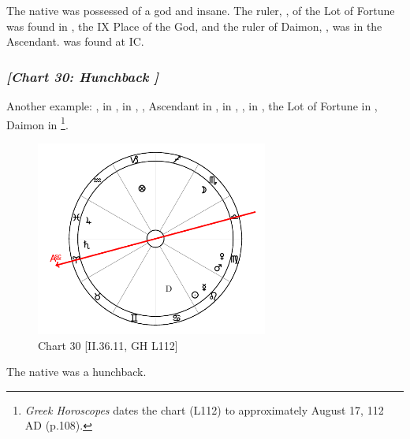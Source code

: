 The native was possessed of a god and insane. The ruler, \Jupiter, of the Lot of Fortune was found in \Libra, the
IX Place of the God, and the ruler of Daimon, \Saturn, was in the Ascendant. \Venus\xspace was found at IC.

\newpage
\subsubsection{\textit{[Chart 30: Hunchback ]}}
Another example: \Sun, \Mercury\xspace in \Leo, \Moon\xspace in \Scorpio, \Saturn, Ascendant in \Aries, \Jupiter\xspace in \Pisces, \Mars, \Venus\xspace in \Virgo, the Lot of Fortune in \Capricorn, Daimon in \Cancer
\footnote{\textit{Greek Horoscopes} dates the chart (L112) to approximately August 17, 112 AD (p.108).}.

\clearpage
\begin{figure}
\centering
\vspace{-20pt}
\includegraphics[width=0.68\textwidth]{charts/2_36_11}
\caption{Chart 30 [II.36.11, GH L112]}
\label{fig:chart30}
\end{figure}


The native was a hunchback.

\newpage